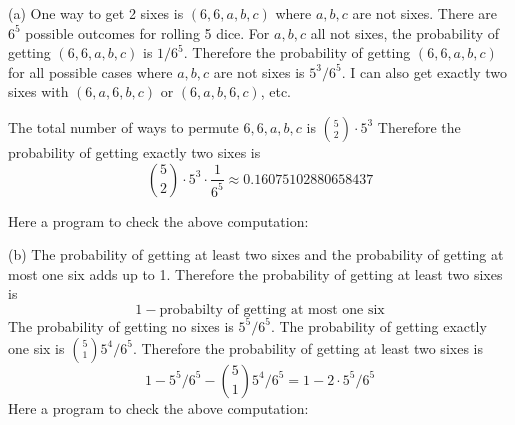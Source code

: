 
(a)
One way to get 2 sixes is $(6, 6, a, b, c)$ where $a, b, c$ are not sixes.
There are $6^5$ possible outcomes for rolling 5 dice.
For $a,b,c$ all not sixes,
the probability of getting $(6, 6, a, b, c)$ is $1/6^5$.
Therefore the probability of getting $(6, 6, a, b, c)$ for all possible
cases where $a,b,c$ are not sixes is $5^3/6^5$.
I can also get exactly two sixes with $(6, a, 6, b, c)$ or
$(6, a, b, 6, c)$, etc.

The total number of ways to permute $6, 6, a, b, c$ is
$\binom{5}{2} \cdot 5^3$
Therefore the probability of getting exactly two sixes is
\[
\binom{5}{2} \cdot 5^3 \cdot \frac{1}{6^5} \approx 0.16075102880658437
\]

Here a program to check the above computation:




(b)
The probability of getting at least two sixes
and the probability of getting at most one six adds up to 1.
Therefore
the probability of getting at least two sixes is
\[
1 - \text{probabilty of getting at most one six}
\]
The probability of getting no sixes is $5^5/6^5$.
The probability of getting exactly one six is $\binom{5}{1} 5^4/6^5$.
Therefore
the probability of getting at least two sixes is
\[
1 - 5^5/6^5 - \binom{5}{1} 5^4/6^5
=
1 - 2 \cdot 5^5/6^5
\]
Here a program to check the above computation:


